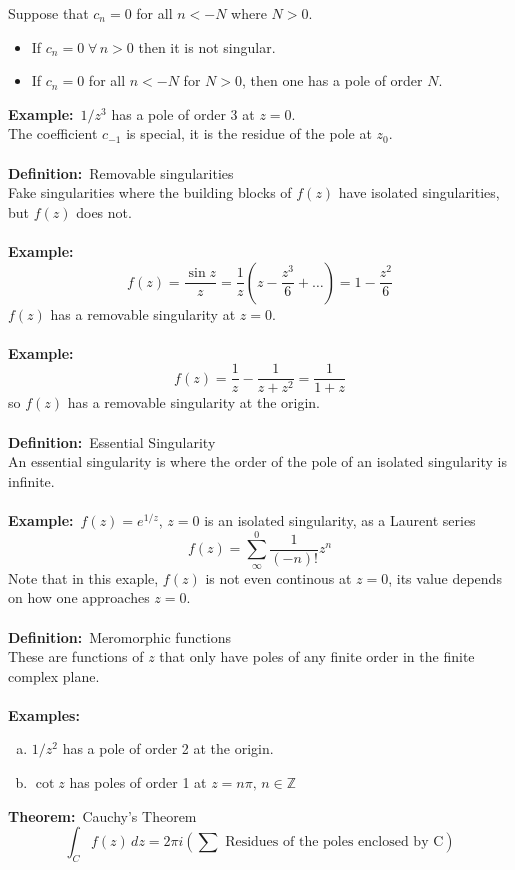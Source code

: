 \documentclass{article}
\newcommand{\definition}{\textbf{Definition:}}
\newcommand{\example}{\textbf{Example:}}
\newcommand{\examples}{\textbf{Examples:}}
\newcommand{\theorem}{\textbf{Theorem:}}
\begin{document}
\noindent
Suppose that $c_n=0$ for all $n< -N$ where $N>0$. 
\begin{itemize}
\item If $c_n = 0 \; \forall \, n >0$ then it is not singular.
\item If $c_n = 0$ for all $n<-N$ for $N>0$, then one has a pole of order
	$N$.
\end{itemize}
\noindent \example\ $1/z^3$ has a pole of order 3 at $z=0$.
\\
The coefficient $c_{-1}$ is special, it is the residue of the pole at 
$z_0$.
\\
\\
\definition\ Removable singularities
\\
Fake singularities where the building blocks of $f(z)$ have isolated
singularities, but $f(z)$ does not.
\\
\\
\example\
\[ f(z) = \frac{\sin z}{z} = \frac{1}{z} ( z - \frac{z^3}{6} + \dots) 
= 1 - \frac{z^2}{6} \]
$f(z)$ has a removable singularity at $z=0$.
\\
\\
\example\
\[ f(z) = \frac{1}{z} - \frac{1}{z + z^2} = \frac{1}{1+z} \]
so $f(z)$ has a removable singularity at the origin.
\\
\\
\definition\ Essential Singularity \\
An essential singularity is where the order of the pole of an isolated
singularity is infinite.
\\
\\
\example\ $f(z) = e^{1/z}$, $z=0$ is an isolated singularity, as a Laurent
series
\[ f(z) = \sum_{\infty}^{0} \frac{1}{(-n)!} z^n \]
Note that in this exaple, $f(z)$ is not even continous at $z=0$, its value
depends on how one approaches $z=0$.
\\
\\
\definition\ Meromorphic functions
\\
These are functions of $z$ that only have poles of any finite order
in the finite complex plane. \\
\\
\examples\
\begin{enumerate}[(a)]
\item $1/z^2$ has a pole of order 2 at the origin.
\item $\cot z$ has poles of order 1 at $z = n\pi, \, n \in \mathbb{Z}$
\end{enumerate}
\noindent \theorem\ Cauchy's Theorem
\[ \int_C f(z) \, dz = 2 \pi i \left( \sum \mbox{ Residues of the poles
enclosed by C} \right) \]
\end{document}
